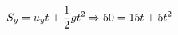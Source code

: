 \documentclass[preview]{standalone}
\begin{document}
\begin{align*}
\special{dvisvgm:raw <g id='unique000'>}S_y = u_y t + \frac{1}{2} g t^2 \Rightarrow 50 = 15t + 5t^2\special{dvisvgm:raw </g>}
\end{align*}
\end{document}
